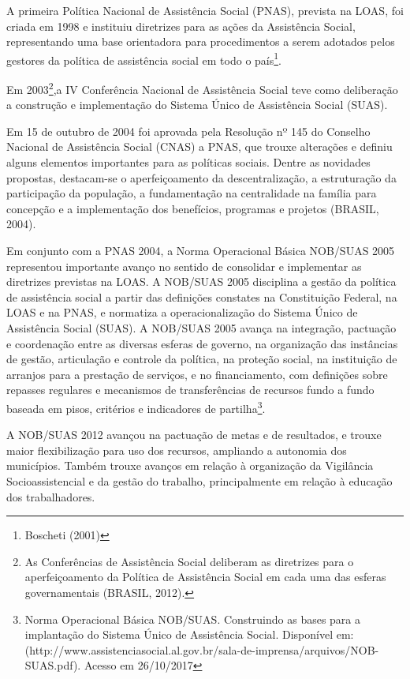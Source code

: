 \documentclass[
  brazilian]{report}
\begin{document}
A primeira Política Nacional de Assistência Social (PNAS), prevista na
LOAS, foi criada em 1998 e instituiu diretrizes para as ações da
Assistência Social, representando uma base orientadora para
procedimentos a serem adotados pelos gestores da política de assistência
social em todo o país\footnote{Boscheti (2001)}.

Em
2003\footnote{As Conferências de Assistência Social deliberam as diretrizes para 
o aperfeiçoamento da Política de Assistência Social em cada uma das esferas 
governamentais (BRASIL, 2012).},a IV Conferência Nacional de Assistência
Social teve como deliberação a construção e implementação do Sistema
Único de Assistência Social (SUAS).

Em 15 de outubro de 2004 foi aprovada pela Resolução nº 145 do Conselho
Nacional de Assistência Social (CNAS) a PNAS, que trouxe alterações e
definiu alguns elementos importantes para as políticas sociais. Dentre
as novidades propostas, destacam-se o aperfeiçoamento da
descentralização, a estruturação da participação da população, a
fundamentação na centralidade na família para concepção e a
implementação dos benefícios, programas e projetos (BRASIL, 2004).

Em conjunto com a PNAS 2004, a Norma Operacional Básica NOB/SUAS 2005
representou importante avanço no sentido de consolidar e implementar as
diretrizes previstas na LOAS. A NOB/SUAS 2005 disciplina a gestão da
política de assistência social a partir das definições constates na
Constituição Federal, na LOAS e na PNAS, e normatiza a operacionalização
do Sistema Único de Assistência Social (SUAS). A NOB/SUAS 2005 avança na
integração, pactuação e coordenação entre as diversas esferas de
governo, na organização das instâncias de gestão, articulação e controle
da política, na proteção social, na instituição de arranjos para a
prestação de serviços, e no financiamento, com definições sobre repasses
regulares e mecanismos de transferências de recursos fundo a fundo
baseada em pisos, critérios e indicadores de
partilha\footnote{Norma Operacional Básica NOB/SUAS. Construindo as bases para a implantação do Sistema Único de Assistência Social. Disponível em:  (http://www.assistenciasocial.al.gov.br/sala-de-imprensa/arquivos/NOB-SUAS.pdf). Acesso em 26/10/2017}.

A NOB/SUAS 2012 avançou na pactuação de metas e de resultados, e trouxe
maior flexibilização para uso dos recursos, ampliando a autonomia dos
municípios. Também trouxe avanços em relação à organização da Vigilância
Socioassistencial e da gestão do trabalho, principalmente em relação à
educação dos trabalhadores.
\end{document}

